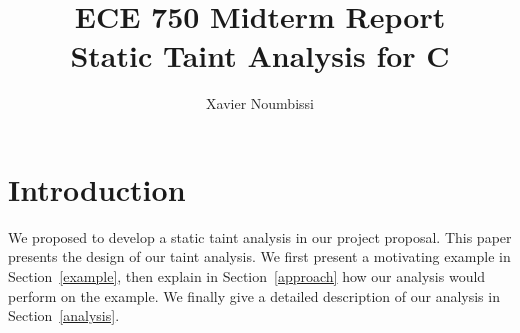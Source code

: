 \documentclass[10pt]{article}
\title{ECE 750 Midterm Report \\ Static Taint Analysis for C}
\author{Xavier Noumbissi}
\date{}
\begin{document}
\maketitle

\section{Introduction}

We proposed to develop a static taint analysis in our
project proposal.
This paper presents the design of our taint analysis.
We first present a motivating example in Section~\ref{example},
then explain in Section~\ref{approach} how our analysis
would perform on the example. We finally give a detailed
description of our analysis in Section~\ref{analysis}.







\end{document}
